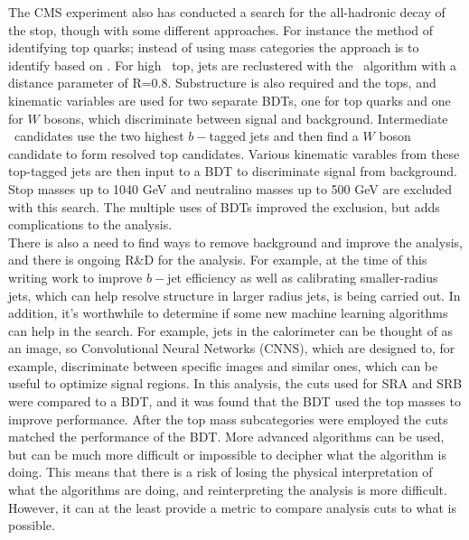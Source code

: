 The CMS experiment also has conducted a search for the all-hadronic decay of the stop, though with some different approaches.  For instance the method of identifying top quarks; instead of using mass categories the approach is to identify based on \pt.  For high \pt\  top, jets are reclustered with the \antikt\ algorithm with a distance parameter of R=0.8.  Substructure is also required and the tops, and kinematic variables are used for two separate BDTs, one for top quarks and one for $W$ bosons, which discriminate between signal and background.  Intermediate \pt\ candidates use the two highest $b-$tagged jets and then find a $W$ boson candidate to form resolved top candidates.  Various kinematic varables from these top-tagged jets are then input to a BDT to discriminate signal from background.  Stop masses up to 1040 GeV and neutralino masses up to 500 GeV are excluded with this search.  The multiple uses of BDTs improved the exclusion, but adds complications to the analysis.\\

There is also a need to find ways to remove background and improve the analysis, and there is ongoing R\&D for the analysis.  For example, at the time of this writing work to improve $b-$jet efficiency as well as calibrating smaller-radius jets, which can help resolve structure in larger radius jets, is being carried out.  In addition, it's worthwhile to determine if some new machine learning algorithms can help in the search.  For example, jets in the calorimeter can be thought of as an image, so Convolutional Neural Networks (CNNS), which are designed to, for example, discriminate between specific images and similar ones, which can be useful to optimize signal regions.  In this analysis, the cuts used for SRA and SRB were compared to a BDT, and it was found that the BDT used the top masses to improve performance.  After the top mass subcategories were employed the cuts matched the performance of the BDT.  More advanced algorithms can be used, but can be much more difficult or impossible to decipher what the algorithm is doing.  This means that there is a risk of losing the physical interpretation of what the algorithms are doing, and reinterpreting the analysis is more difficult.  However, it can at the least provide a metric to compare analysis cuts to what is possible. \\




